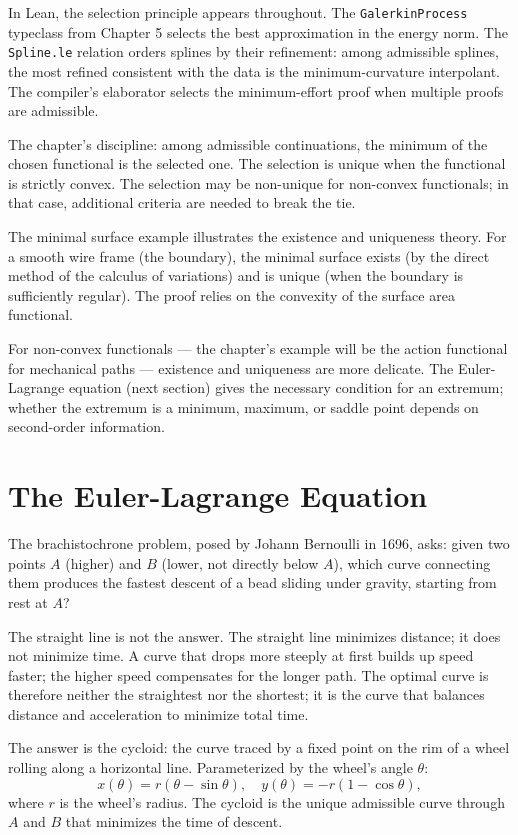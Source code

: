 In Lean, the selection principle appears throughout. The
\texttt{GalerkinProcess} typeclass from Chapter 5 selects the
best approximation in the energy norm. The \texttt{Spline.le}
relation orders splines by their refinement: among admissible
splines, the most refined consistent with the data is the
minimum-curvature interpolant. The compiler's elaborator selects
the minimum-effort proof when multiple proofs are admissible.

The chapter's discipline: among admissible continuations, the
minimum of the chosen functional is the selected one. The
selection is unique when the functional is strictly convex. The
selection may be non-unique for non-convex functionals; in that
case, additional criteria are needed to break the tie.

The minimal surface example illustrates the existence and uniqueness
theory. For a smooth wire frame (the boundary), the minimal surface
exists (by the direct method of the calculus of variations) and is
unique (when the boundary is sufficiently regular). The proof
relies on the convexity of the surface area functional.

For non-convex functionals --- the chapter's example will be the
action functional for mechanical paths --- existence and uniqueness
are more delicate. The Euler-Lagrange equation (next section) gives
the necessary condition for an extremum; whether the extremum is a
minimum, maximum, or saddle point depends on second-order
information.

\section{The Euler-Lagrange Equation}
\label{se:the-euler-lagrange-equation}

The brachistochrone problem, posed by Johann Bernoulli in 1696, asks:
given two points $A$ (higher) and $B$ (lower, not directly below $A$),
which curve connecting them produces the fastest descent of a bead
sliding under gravity, starting from rest at $A$?

The straight line is not the answer. The straight line minimizes
distance; it does not minimize time. A curve that drops more steeply
at first builds up speed faster; the higher speed compensates for
the longer path. The optimal curve is therefore neither the
straightest nor the shortest; it is the curve that balances distance
and acceleration to minimize total time.

The answer is the cycloid: the curve traced by a fixed point on the
rim of a wheel rolling along a horizontal line. Parameterized by the
wheel's angle $\theta$:
\[
x(\theta) = r(\theta - \sin\theta), \quad y(\theta) = -r(1 - \cos\theta),
\]
where $r$ is the wheel's radius. The cycloid is the unique
admissible curve through $A$ and $B$ that minimizes the time of
descent.

